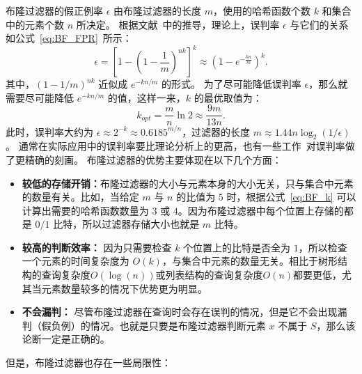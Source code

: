 布隆过滤器的假正例率 $\epsilon$ 由布隆过滤器的长度 $m$，使用的哈希函数个数 $k$ 和集合中的元素个数 $n$ 所决定。
根据文献~\cite{luo2019optimizing}中的推导，理论上，误判率 $\epsilon$ 与它们的关系如公式~\eqref{eq:BF_FPR}~所示：
\begin{equation}
    \epsilon = \left[ 1 - \left( 1 - \frac{1}{m} \right)^{nk} \right]^k \approx \left(1 - e^{-\frac{kn}m{}}\right)^k.
    \label{eq:BF_FPR}
\end{equation}
其中，$(1-1/m)^{nk}$ 近似成 $e^{-kn/m}$ 的形式。
为了尽可能降低误判率 $\epsilon$，那么就需要尽可能降低 $e^{-kn/m}$ 的值，这样一来，$k$ 的最优取值为：
\begin{equation}
    k_{opt}= \frac{m}{n}\ln 2 \approx \frac{9m}{13n}.
    \label{eq:BF_k}
\end{equation}
此时，误判率大约为 $\epsilon \approx 2^{-k}\approx 0.6185^{m/n}$，过滤器的长度 $m\approx 1.44n\log_2{(1/\epsilon)}$。
通常在实际应用中的误判率要比理论分析上的更高，也有一些工作~\cite{bose2008falsepositive,christensen2010new}对误判率做了更精确的刻画。
布隆过滤器的优势主要体现在以下几个方面：
\begin{itemize}
    \item \textbf{较低的存储开销：}布隆过滤器的大小与元素本身的大小无关，只与集合中元素的数量有关。比如，当给定 $m$ 与 $n$ 的比值为 $5$ 时，根据公式~\eqref{eq:BF_k} 可以计算出需要的哈希函数数量为 $3$ 或 $4$。因为布隆过滤器中每个位置上存储的都是 $0/1$ 比特，所以过滤器存储大小也就是 $m$ 比特。
    \item \textbf{较高的判断效率：} 因为只需要检查 $k$ 个位置上的比特是否全为 $1$，所以检查一个元素的时间复杂度为 $O(k)$，与集合中元素的数量无关。相比于树形结构的查询复杂度$O(\log(n))$或列表结构的查询复杂度$O(n)$都要更低，尤其当元素数量较多的情况下优势更为明显。
    \item \textbf{不会漏判：} 尽管布隆过滤器在查询时会存在误判的情况，但是它不会出现漏判（假负例）的情况。也就是只要是布隆过滤器判断元素 $x$ 不属于 $S$，那么该论断一定是正确的。
\end{itemize}
但是，布隆过滤器也存在一些局限性：
